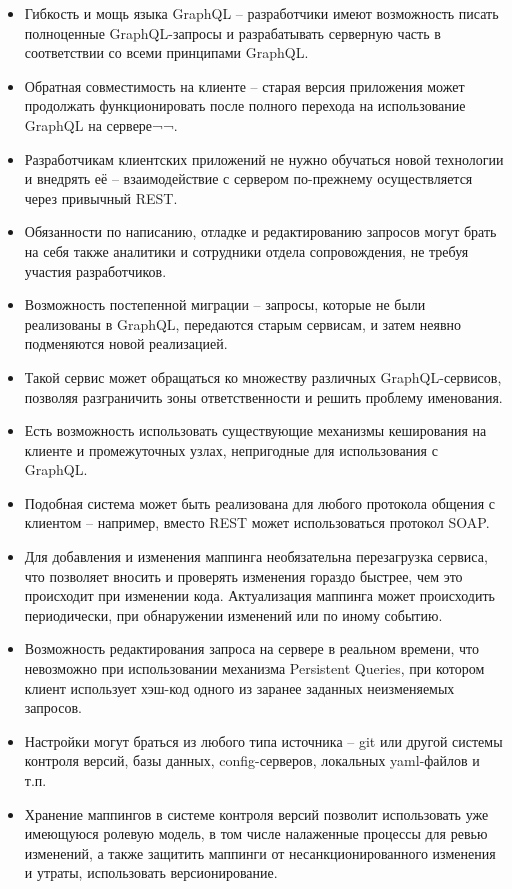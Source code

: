 \begin{itemize}
	\item Гибкость и мощь языка GraphQL – разработчики имеют возможность писать полноценные GraphQL-запросы и разрабатывать серверную часть в соответствии со всеми принципами GraphQL.
	\item Обратная совместимость на клиенте – старая версия приложения может продолжать функционировать после полного перехода на использование GraphQL на сервере¬¬.
	\item Разработчикам клиентских приложений не нужно обучаться новой технологии и внедрять её – взаимодействие с сервером по-прежнему осуществляется через привычный REST.
	\item Обязанности по написанию, отладке и редактированию запросов могут брать на себя также аналитики и сотрудники отдела сопровождения, не требуя участия разработчиков.
	\item Возможность постепенной миграции – запросы, которые не были реализованы в GraphQL, передаются старым сервисам, и затем неявно подменяются новой реализацией.
	\item Такой сервис может обращаться ко множеству различных GraphQL-сервисов, позволяя разграничить зоны ответственности и решить проблему именования.
	\item Есть возможность использовать существующие механизмы кеширования на клиенте и промежуточных узлах, непригодные для использования с GraphQL.
	\item Подобная система может быть реализована для любого протокола общения с клиентом – например, вместо REST может использоваться протокол SOAP.
	\item Для добавления и изменения маппинга необязательна перезагрузка сервиса, что позволяет вносить и проверять изменения гораздо быстрее, чем это происходит при изменении кода.
	Актуализация маппинга может происходить периодически, при обнаружении изменений или по иному событию.
	\item Возможность редактирования запроса на сервере в реальном времени, что невозможно при использовании механизма Persistent Queries, при котором клиент использует хэш-код одного из заранее заданных неизменяемых запросов.
	\item Настройки могут браться из любого типа источника – git или другой системы контроля версий, базы данных, config-серверов, локальных yaml-файлов и т.п.
	\item Хранение маппингов в системе контроля версий позволит использовать уже имеющуюся ролевую модель, в том числе налаженные процессы для ревью изменений, а также защитить маппинги от несанкционированного изменения и утраты, использовать версионирование.

\end{itemize}
